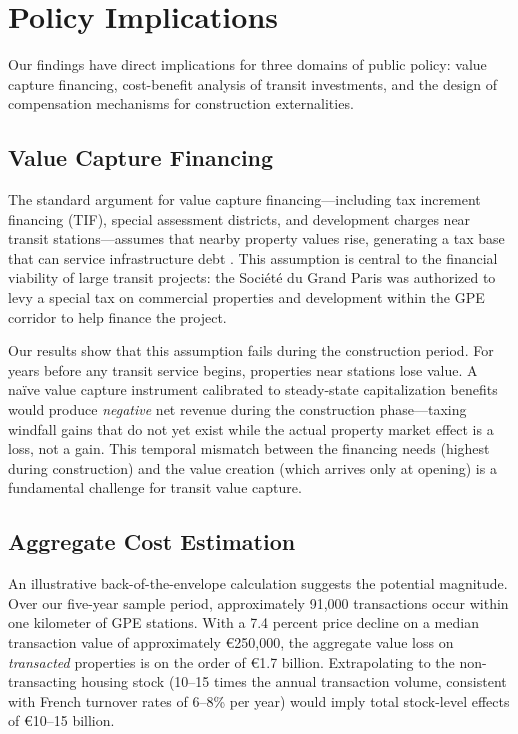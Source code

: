 \documentclass[12pt]{article}
\begin{document}
\section{Policy Implications}
\label{sec:welfare}

Our findings have direct implications for three domains of public policy: value capture financing, cost-benefit analysis of transit investments, and the design of compensation mechanisms for construction externalities.

\subsection{Value Capture Financing}

The standard argument for value capture financing---including tax increment financing (TIF), special assessment districts, and development charges near transit stations---assumes that nearby property values rise, generating a tax base that can service infrastructure debt \citep{medda2012land}. This assumption is central to the financial viability of large transit projects: the Soci\'{e}t\'{e} du Grand Paris was authorized to levy a special tax on commercial properties and development within the GPE corridor to help finance the project.

Our results show that this assumption fails during the construction period. For years before any transit service begins, properties near stations lose value. A na\"ive value capture instrument calibrated to steady-state capitalization benefits would produce \textit{negative} net revenue during the construction phase---taxing windfall gains that do not yet exist while the actual property market effect is a loss, not a gain. This temporal mismatch between the financing needs (highest during construction) and the value creation (which arrives only at opening) is a fundamental challenge for transit value capture.

\subsection{Aggregate Cost Estimation}

An illustrative back-of-the-envelope calculation suggests the potential magnitude. Over our five-year sample period, approximately 91,000 transactions occur within one kilometer of GPE stations. With a 7.4 percent price decline on a median transaction value of approximately \euro250,000, the aggregate value loss on \textit{transacted} properties is on the order of \euro1.7 billion. Extrapolating to the non-transacting housing stock (10--15 times the annual transaction volume, consistent with French turnover rates of 6--8\% per year) would imply total stock-level effects of \euro10--15 billion.
\end{document}
